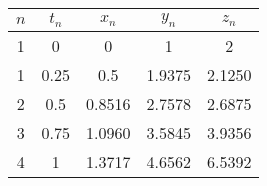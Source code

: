		\begin{table}[H]
			\centering
			\begin{tabular}{|c|c|c|c|c|}
				\hline
				$n$ & $t_{n}$ & $x_{n}$ & $y_{n}$ & $z_{n}$ \\ \hline
				1 & 0 & 0 & 1 & 2 \\ \hline
				1 & 0.25 & 0.5 & 1.9375 & 2.1250 \\ \hline
				2 & 0.5 & 0.8516 & 2.7578 & 2.6875 \\ \hline
				3 & 0.75 & 1.0960 & 3.5845 & 3.9356 \\ \hline
				4 & 1 & 1.3717 & 4.6562 & 6.5392 \\ \hline
			\end{tabular}
		\end{table}
